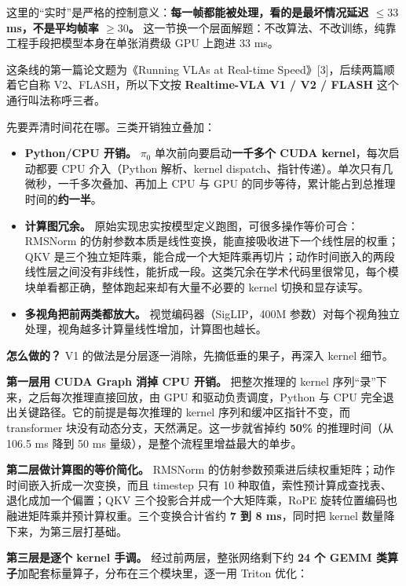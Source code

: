 \documentclass[
  chinese,
]{ctexart}
\providecommand{\tightlist}{%
  \setlength{\itemsep}{0pt}\setlength{\parskip}{0pt}}
\begin{document}
这里的``实时''是严格的控制意义：\textbf{每一帧都能被处理，看的是最坏情况延迟
\(\leq 33\) ms，不是平均帧率 \(\geq 30\)。}
这一节换一个层面解题：不改算法、不改训练，纯靠工程手段把模型本身在单张消费级
GPU 上跑进 33 ms。

这条线的第一篇论文题为《Running VLAs at Real-time
Speed》{[}3{]}，后续两篇顺着它自称 V2、FLASH，所以下文按
\textbf{Realtime-VLA V1 / V2 / FLASH} 这个通行叫法称呼三者。

先要弄清时间花在哪。三类开销独立叠加：

\begin{itemize}
\tightlist
\item
  \textbf{Python/CPU 开销。} \(\pi_0\) 单次前向要启动\textbf{一千多个
  CUDA kernel}，每次启动都要 CPU 介入（Python 解析、kernel
  dispatch、指针传递）。单次只有几微秒，一千多次叠加、再加上 CPU 与 GPU
  的同步等待，累计能占到总推理时间的\textbf{约一半}。
\item
  \textbf{计算图冗余。}
  原始实现忠实按模型定义跑图，可很多操作等价可合：RMSNorm
  的仿射参数本质是线性变换，能直接吸收进下一个线性层的权重；QKV
  是三个独立矩阵乘，能合成一个大矩阵乘再切片；动作时间嵌入的两段线性层之间没有非线性，能折成一段。这类冗余在学术代码里很常见，每个模块单看都正确，整体跑起来却有大量不必要的
  kernel 切换和显存读写。
\item
  \textbf{多视角把前两类都放大。} 视觉编码器（SigLIP，400M
  参数）对每个视角独立处理，视角越多计算量线性增加，计算图也越长。
\end{itemize}

\textbf{怎么做的？} V1 的做法是分层逐一消除，先摘低垂的果子，再深入
kernel 细节。

\textbf{第一层用 CUDA Graph 消掉 CPU 开销。} 把整次推理的 kernel
序列``录''下来，之后每次推理直接回放，由 GPU 和驱动负责调度，Python 与
CPU 完全退出关键路径。它的前提是每次推理的 kernel
序列和缓冲区指针不变，而 transformer
块没有动态分支，天然满足。这一步就省掉约 \textbf{50\%} 的推理时间（从
106.5 ms 降到 50 ms 量级），是整个流程里增益最大的单步。

\textbf{第二层做计算图的等价简化。} RMSNorm
的仿射参数预乘进后续权重矩阵；动作时间嵌入折成一次变换，而且 timestep
只有 10 种取值，索性预计算成查找表、退化成加一个偏置；QKV
三个投影合并成一个大矩阵乘，RoPE
旋转位置编码也融进矩阵乘并预计算权重。三个变换合计省约 \textbf{7 到 8
ms}，同时把 kernel 数量降下来，为第三层打基础。

\textbf{第三层是逐个 kernel 手调。} 经过前两层，整张网络剩下约
\textbf{24 个 GEMM 类算子}加配套标量算子，分布在三个模块里，逐一用
Triton 优化：
\end{document}
